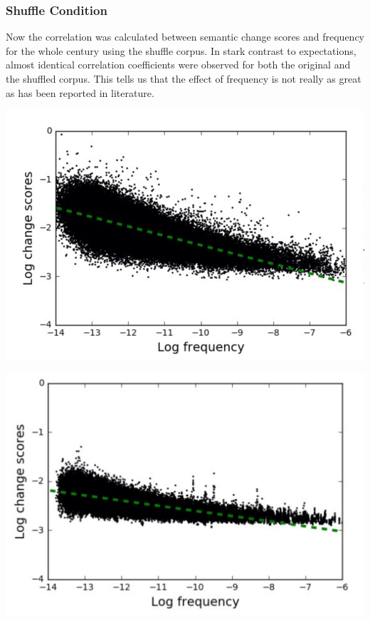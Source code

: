 \documentclass[a0,landscape]{a0poster}
\begin{document}
\begin{multicols}{4}
\subsubsection*{Shuffle Condition} 
Now the correlation was calculated between semantic change scores and frequency for the whole century using the shuffle corpus. In stark contrast to expectations, almost identical correlation coefficients were observed for both the original and the shuffled corpus. This tells us that the effect of frequency is not really as great as has been reported in literature.

\begin{center}\vspace{1cm}
  \includegraphics[width=0.8\linewidth]{image7.png}
\end{center}\vspace{1cm}

\begin{center}\vspace{1cm}
  \includegraphics[width=0.8\linewidth]{image5.png}
\end{center}\vspace{1cm}


\end{multicols}
\end{document}
